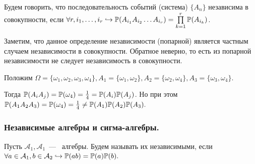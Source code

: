 \begin{definition}
    Будем говорить, что последовательность событий (система) $\{A_n\}$ независима в совокупности, если $\forall r, i_1, \dots, i_r \hookrightarrow \P(A_{i_1}A_{i_2}\dots A_{i_r}) = \prod\limits_{k = 1}^{r}\P(A_{i_k})$.
\end{definition}
\noindent Заметим, что данное определение независимости (попарной) является частным случаем независимости в совокупности. Обратное неверно, то есть из попарной независимости не следует независимость в совокупности. 

\begin{example}
    Положим $\Omega = \{\omega_1, \omega_2, \omega_3, \omega_4\}, A_1 = \{\omega_1, \omega_2\}, A_2 = \{\omega_2, \omega_4\}, A_3 = \{\omega_3, \omega_4\}.$
    
    \noindent Тогда $\P(A_iA_j) = \P(\omega_4) = \frac{1}{4} = \P(A_i)\P(A_j)$. Но при этом $\P(A_1A_2A_3) = \P(\omega_4) = \frac{1}{4} \neq \P(A_1)\P(A_2)\P(A_3).$
\end{example}

\subsubsection{Независимые алгебры и сигма-алгебры.}
\begin{definition}
    Пусть $\mathcal{A}_1, \mathcal{A}_1$~---~ алгебры. Будем называть их независимыми, если $\forall a \in \mathcal{A}_1, b \in \mathcal{A}_2 \hookrightarrow \P(ab) = \P(a)\P(b).$
\end{definition}

